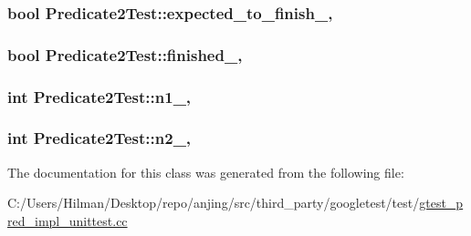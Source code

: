 \subsubsection[{expected\+\_\+to\+\_\+finish\+\_\+}]{\setlength{\rightskip}{0pt plus 5cm}bool Predicate2\+Test\+::expected\+\_\+to\+\_\+finish\+\_\+\hspace{0.3cm}{\ttfamily [static]}, {\ttfamily [protected]}}\label{class_predicate2_test_a56cf1f0f556addd9a62e0644dc1a86fc}
\hypertarget{class_predicate2_test_a30f4ef76d3004253078e767e5c653b85}{}
\subsubsection[{finished\+\_\+}]{\setlength{\rightskip}{0pt plus 5cm}bool Predicate2\+Test\+::finished\+\_\+\hspace{0.3cm}{\ttfamily [static]}, {\ttfamily [protected]}}\label{class_predicate2_test_a30f4ef76d3004253078e767e5c653b85}
\hypertarget{class_predicate2_test_ac002d8e279b24e75906fd19973fc2170}{}
\subsubsection[{n1\+\_\+}]{\setlength{\rightskip}{0pt plus 5cm}int Predicate2\+Test\+::n1\+\_\+\hspace{0.3cm}{\ttfamily [static]}, {\ttfamily [protected]}}\label{class_predicate2_test_ac002d8e279b24e75906fd19973fc2170}
\hypertarget{class_predicate2_test_a9dbe5173570b9b911af2df889c287027}{}
\subsubsection[{n2\+\_\+}]{\setlength{\rightskip}{0pt plus 5cm}int Predicate2\+Test\+::n2\+\_\+\hspace{0.3cm}{\ttfamily [static]}, {\ttfamily [protected]}}\label{class_predicate2_test_a9dbe5173570b9b911af2df889c287027}


The documentation for this class was generated from the following file\+:\begin{DoxyCompactItemize}
\item 
C\+:/\+Users/\+Hilman/\+Desktop/repo/anjing/src/third\+\_\+party/googletest/test/\hyperlink{gtest__pred__impl__unittest_8cc}{gtest\+\_\+pred\+\_\+impl\+\_\+unittest.\+cc}\end{DoxyCompactItemize}
